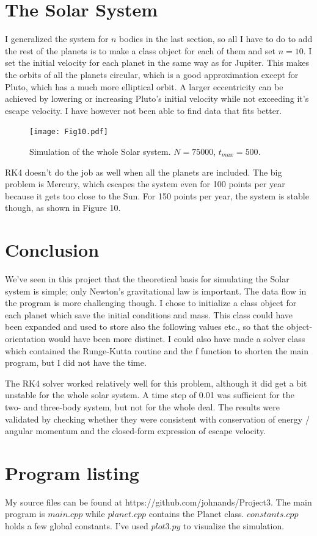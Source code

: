 \documentclass[a4paper,12pt, english]{article}
\begin{document}
\section*{The Solar System}
I generalized the system for $n$ bodies in the last section, so all I have to do to add the rest of the planets is to make a class object for each of them and set $n = 10$. I set the initial velocity for each planet in the same way as for Jupiter. This makes the orbits of all the planets circular, which is a good approximation except for Pluto, which has a much more elliptical orbit. A larger eccentricity can be achieved by lowering or increasing Pluto's initial velocity while not exceeding it's escape velocity. I have however not been able to find data that fits better.

\begin{figure}[!h]
\centering
\texttt{[image: Fig10.pdf]}
\caption{Simulation of the whole Solar system. $N = 75000$, $t_{max} = 500$.}
\end{figure} 

RK4 doesn't do the job as well when all the planets are included. The big problem is Mercury, which escapes the system even for 100 points per year because it gets too close to the Sun. For 150 points per year, the system is stable though, as shown in Figure 10. 

\section*{Conclusion}
We've seen in this project that the theoretical basis for simulating the Solar system is simple; only Newton's gravitational law is important. The data flow in the program is more challenging though. I chose to initialize a class object for each planet which save the initial conditions and mass. This class could have been expanded and used to store also the following values etc., so that the object-orientation would have been more distinct. I could also have made a solver class which contained the Runge-Kutta routine and the f function to shorten the main program, but I did not have the time.

The RK4 solver worked relatively well for this problem, although it did get a bit unstable for the whole solar system. A time step of 0.01 was sufficient for the two- and three-body system, but not for the whole deal. The results were validated by checking whether they were consistent with conservation of energy / angular momentum and the closed-form expression of escape velocity. 

\section*{Program listing}
My source files can be found at https://github.com/johnands/Project3.
The main program is $main.cpp$ while $planet.cpp$ contains the Planet class. $constants.cpp$ holds a few global constants. I've used $plot3.py$ to visualize the simulation. 
\end{document}
